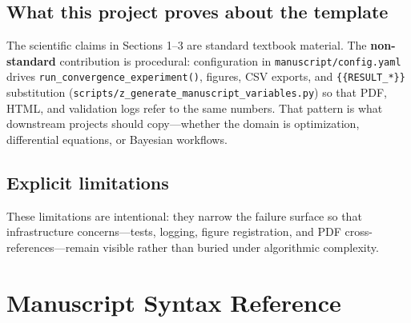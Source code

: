 \documentclass[
]{article}
\providecommand{\tightlist}{%
  \setlength{\itemsep}{0pt}\setlength{\parskip}{0pt}}
\begin{document}
\subsection{What this project proves about the
template}\label{what-this-project-proves-about-the-template}

The scientific claims in Sections 1--3 are standard textbook material.
The \textbf{non-standard} contribution is procedural: configuration in
\texttt{manuscript/config.yaml} drives
\texttt{run\_convergence\_experiment()}, figures, CSV exports, and
\texttt{\{\{RESULT\_*\}\}} substitution
(\texttt{scripts/z\_generate\_manuscript\_variables.py}) so that PDF,
HTML, and validation logs refer to the same numbers. That pattern is
what downstream projects should copy---whether the domain is
optimization, differential equations, or Bayesian workflows.

\subsection{Explicit limitations}\label{explicit-limitations}


These limitations are intentional: they narrow the failure surface so
that infrastructure concerns---tests, logging, figure registration, and
PDF cross-references---remain visible rather than buried under
algorithmic complexity.

\newpage

\section{Manuscript Syntax Reference}\label{manuscript-syntax-reference}
\end{document}
